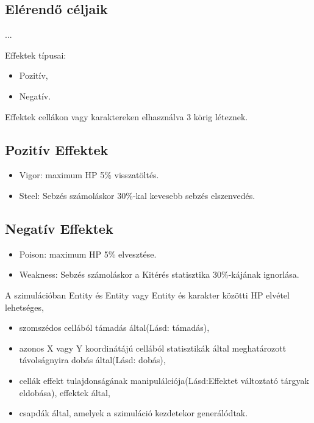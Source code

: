 \subsection{Elérendő céljaik}

...


Effektek típusai:
\begin{itemize}
    \item Pozitív,
    \item Negatív.
\end{itemize}
Effektek cellákon vagy karaktereken elhasználva 3 körig léteznek.

\subsection{Pozitív Effektek}

\begin{itemize}
    \item Vigor: maximum HP 5\% visszatöltés.
    \item Steel: Sebzés számoláskor 30\%-kal kevesebb sebzés elszenvedés.
\end{itemize}

\subsection{Negatív Effektek}

\begin{itemize}
    \item Poison: maximum HP 5\% elvesztése.
    \item Weakness: Sebzés számoláskor a Kitérés statisztika 30\%-kájának ignorlása.
\end{itemize}


A szimulációban Entity és Entity vagy Entity és karakter közötti HP elvétel lehetséges,
\begin{itemize}
    \item szomszédos cellából támadás által(Lásd: támadás),
    \item azonos X vagy Y koordinátájú cellából statisztikák által meghatározott távolságnyira dobás által(Lásd: dobás),
    \item cellák effekt tulajdonságának manipulálciója(Lásd:Effektet változtató tárgyak eldobása), effektek által,
    \item csapdák által, amelyek a szimuláció kezdetekor generálódtak.
\end{itemize}

